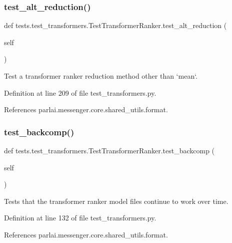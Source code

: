 \subsubsection{\texorpdfstring{test\+\_\+alt\+\_\+reduction()}{test\_alt\_reduction()}}
{\footnotesize\ttfamily def tests.\+test\+\_\+transformers.\+Test\+Transformer\+Ranker.\+test\+\_\+alt\+\_\+reduction (\begin{DoxyParamCaption}\item[{}]{self }\end{DoxyParamCaption})}

\begin{DoxyVerb}Test a transformer ranker reduction method other than `mean`.\end{DoxyVerb}
 

Definition at line 209 of file test\+\_\+transformers.\+py.



References parlai.\+messenger.\+core.\+shared\+\_\+utils.\+format.

\mbox{\label{classtests_1_1test__transformers_1_1TestTransformerRanker_a63dd66de96a7eee38a2bf477bd27441f}} 
\subsubsection{\texorpdfstring{test\+\_\+backcomp()}{test\_backcomp()}}
{\footnotesize\ttfamily def tests.\+test\+\_\+transformers.\+Test\+Transformer\+Ranker.\+test\+\_\+backcomp (\begin{DoxyParamCaption}\item[{}]{self }\end{DoxyParamCaption})}

\begin{DoxyVerb}Tests that the transformer ranker model files continue to work over time.\end{DoxyVerb}
 

Definition at line 132 of file test\+\_\+transformers.\+py.



References parlai.\+messenger.\+core.\+shared\+\_\+utils.\+format.

